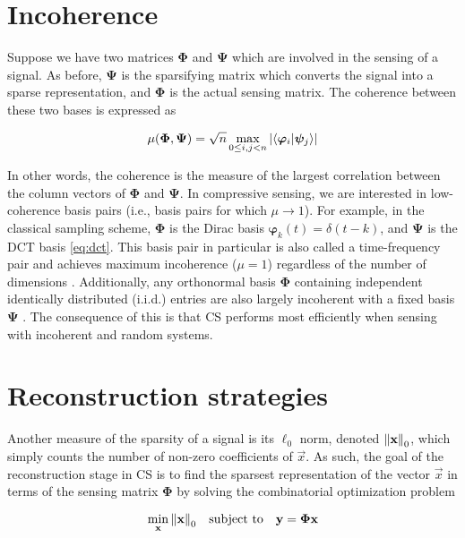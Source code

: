 \section{Incoherence}
\label{sec:incoherence}

Suppose we have two matrices $\bm\Phi$ and $\bm\Psi$ which are involved in the sensing of a signal. As before, $\bm\Psi$ is the sparsifying matrix which converts the signal into a sparse representation, and $\bm\Phi$ is the actual sensing matrix. The coherence between these two bases is expressed as

\begin{equation}\label{eq:coherence}
	\mu\qty(\bm\Phi, \bm\Psi) = \sqrt{n} \max_{0 \leq i,j < n} \abs{\innerproduct{\bm\varphi_i}{\bm\psi_j}}
\end{equation}

In other words, the coherence is the measure of the largest correlation between the column vectors of $\bm\Phi$ and $\bm\Psi$. In compressive sensing, we are interested in low-coherence basis pairs (i.e., basis pairs for which $\mu \rightarrow 1$). For example, in the classical sampling scheme, $\bm\Phi$ is the Dirac basis $\bm\varphi_k(t) = \delta(t - k)$, and $\bm\Psi$ is the DCT basis \eqref{eq:dct}. This basis pair in particular is also called a time-frequency pair and achieves maximum incoherence ($\mu = 1$) regardless of the number of dimensions \cite{Donoho2001}. Additionally, any orthonormal basis $\bm\Phi$ containing independent identically distributed (i.i.d.) entries are also largely incoherent with a fixed basis $\bm\Psi$ \cite{Candes2008b}. The consequence of this is that CS performs most efficiently when sensing with incoherent and random systems.


\section{Reconstruction strategies}
\label{sec:reconstruct}
Another measure of the sparsity of a signal is its $\ell_0$ norm, denoted $\norm{\text{\bfseries x}}_0$, which simply counts the number of non-zero coefficients of $\vec{x}$. As such, the goal of the reconstruction stage in CS is to find the sparsest representation of the vector $\vec{x}$ in terms of the sensing matrix $\bm\Phi$ by solving the combinatorial optimization problem

\begin{equation}\label{eq:min-l0}
	\min_{\text{\bfseries x}} \norm{\text{\bfseries x}}_0 \quad \textrm{subject to} \quad \text{\bfseries y} = \bm\Phi \text{\bfseries x}
\end{equation}


